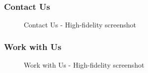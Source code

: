 \documentclass[11pt, letterpaper]{article}
\begin{document}
\subsubsection*{Contact Us}
\begin{figure}[H]
    \centering
    \setlength{\fboxsep}{0pt}
    \caption{Contact Us - High-fidelity screenshot}
    \label{fig:PageScreenshot_Contact_Us}
\end{figure}

\subsubsection*{Work with Us}
\begin{figure}[H]
    \centering
    \setlength{\fboxsep}{0pt}
    \caption{Work with Us - High-fidelity screenshot}
    \label{fig:PageScreenshot_Work_with_Us}
\end{figure}
\end{document}
